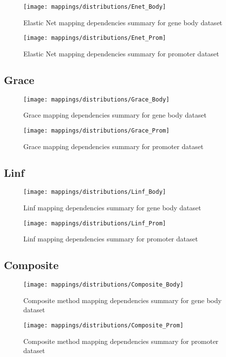 \begin{figure}[H]
	\centering
	\texttt{[image: mappings/distributions/Enet\_Body]}
	\caption{Elastic Net mapping dependencies summary for gene body dataset}
	\label{fig:map_body_enet}
\end{figure}

\begin{figure}[H]
	\centering
	\texttt{[image: mappings/distributions/Enet\_Prom]}
	\caption{Elastic Net mapping dependencies summary for promoter dataset}
	\label{fig:map_prom_enet}
\end{figure}


\pagebreak
\subsection{Grace}

\begin{figure}[H]
	\centering
	\texttt{[image: mappings/distributions/Grace\_Body]}
	\caption{Grace mapping dependencies summary for gene body dataset}
	\label{fig:map_body_grace}
\end{figure}

\begin{figure}[H]
	\centering
	\texttt{[image: mappings/distributions/Grace\_Prom]}
	\caption{Grace mapping dependencies summary for promoter dataset}
	\label{fig:map_prom_grace}
\end{figure}


\pagebreak
\subsection{Linf}

\begin{figure}[H]
	\centering
	\texttt{[image: mappings/distributions/Linf\_Body]}
	\caption{Linf mapping dependencies summary for gene body dataset}
	\label{fig:map_body_linf}
\end{figure}

\begin{figure}[H]
	\centering
	\texttt{[image: mappings/distributions/Linf\_Prom]}
	\caption{Linf mapping dependencies summary for promoter dataset}
	\label{fig:map_prom_linf}
\end{figure}


\pagebreak
\subsection{Composite}

\begin{figure}[H]
	\centering
	\texttt{[image: mappings/distributions/Composite\_Body]}
	\caption{Composite method mapping dependencies summary for gene body dataset}
	\label{fig:map_body_comp}
\end{figure}

\begin{figure}[H]
	\centering
	\texttt{[image: mappings/distributions/Composite\_Prom]}
	\caption{Composite method mapping dependencies summary for promoter dataset}
	\label{fig:map_prom_comp}
\end{figure}